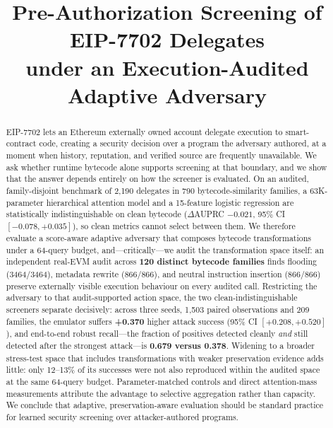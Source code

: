 \documentclass[conference]{IEEEtran}
\begin{document}
\title{Pre-Authorization Screening of EIP-7702 Delegates\\under an Execution-Audited Adaptive Adversary}

\maketitle

\begin{abstract}
EIP-7702 lets an Ethereum externally owned account delegate execution to smart-contract code, creating a security decision over a program the adversary authored, at a moment when history, reputation, and verified source are frequently unavailable. We ask whether runtime bytecode alone supports screening at that boundary, and we show that the answer depends entirely on how the screener is evaluated. On an audited, family-disjoint benchmark of 2,190 delegates in 790 bytecode-similarity families, a 63K-parameter hierarchical attention model and a 15-feature logistic regression are statistically indistinguishable on clean bytecode ($\Delta$AUPRC $-0.021$, 95\% CI $[-0.078,+0.035]$), so clean metrics cannot select between them. We therefore evaluate a score-aware adaptive adversary that composes bytecode transformations under a 64-query budget, and---critically---we audit the transformation space itself: an independent real-EVM audit across \textbf{120 distinct bytecode families} finds flooding (3464/3464), metadata rewrite (866/866), and neutral instruction insertion (866/866) preserve externally visible execution behaviour on every audited call. Restricting the adversary to that audit-supported action space, the two clean-indistinguishable screeners separate decisively: across three seeds, 1,503 paired observations and 209 families, the emulator suffers \textbf{+0.370} higher attack success (95\% CI $[+0.208,+0.520]$), and end-to-end robust recall---the fraction of positives detected cleanly \emph{and} still detected after the strongest attack---is \textbf{0.679 versus 0.378}. Widening to a broader stress-test space that includes transformations with weaker preservation evidence adds little: only 12--13\% of its successes were not also reproduced within the audited space at the same 64-query budget. Parameter-matched controls and direct attention-mass measurements attribute the advantage to selective aggregation rather than capacity. We conclude that adaptive, preservation-aware evaluation should be standard practice for learned security screening over attacker-authored programs.
\end{abstract}
\end{document}
